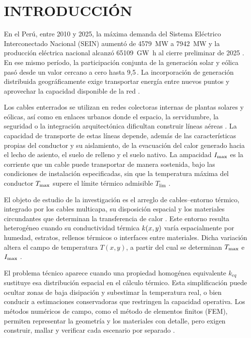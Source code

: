 \chapter*{INTRODUCCIÓN}
\thispagestyle{empty}

En el Perú, entre 2010 y 2025, la máxima demanda del Sistema Eléctrico Interconectado Nacional (SEIN) aumentó de \SI{4579}{\mega\watt} a \SI{7942}{\mega\watt} y la producción eléctrica nacional alcanzó \SI{65109}{\giga\watt\hour} al cierre preliminar de 2025 \parencites[sec.~10.4]{minem2025anuario2024}[cuadro~4]{minem2025indicadoresDiciembre}{coesMaximaDemanda}. En ese mismo período, la participación conjunta de la generación solar y eólica pasó desde un valor cercano a cero hasta 9,5\,\pct{}. La incorporación de generación distribuida geográficamente exige transportar energía entre nuevos puntos y aprovechar la capacidad disponible de la red \parencite{iea2025transmissiongrid}.

Los cables enterrados se utilizan en redes colectoras internas de plantas solares y eólicas, así como en enlaces urbanos donde el espacio, la servidumbre, la seguridad o la integración arquitectónica dificultan construir líneas aéreas \parencites{cigre2023overheadLines}{coes2021puntaLomitasEO}{coes2022planTransmision2023_2032}{proinversion2026palian}. La capacidad de transporte de estas líneas depende, además de las características propias del conductor y su aislamiento, de la evacuación del calor generado hacia el lecho de asiento, el suelo de relleno y el suelo nativo. La ampacidad $I_{\max}$ es la corriente que un cable puede transportar de manera sostenida, bajo las condiciones de instalación especificadas, sin que la temperatura máxima del conductor $T_{\max}$ supere el límite térmico admisible $T_{\mathrm{lim}}$ \parencites[cláusulas~4--5]{iec60287}[3--5]{enescu2020}.

El objeto de estudio de la investigación es el arreglo de cables--entorno térmico, integrado por los cables multicapa, su disposición espacial y los materiales circundantes que determinan la transferencia de calor \parencites[1--3]{enescu2020}[41--42]{cigre2025}. Este entorno resulta heterogéneo cuando su conductividad térmica $k(x,y)$ varía espacialmente por humedad, estratos, rellenos térmicos o interfaces entre materiales. Dicha variación altera el campo de temperatura $T(x,y)$, a partir del cual se determinan $T_{\max}$ e $I_{\max}$ \parencites[3--4]{enescu2021}[1,6--7]{khumalo2025}[3]{xing2023}.

El problema técnico aparece cuando una propiedad homogénea equivalente $k_{eq}$ sustituye esa distribución espacial en el cálculo térmico. Esta simplificación puede ocultar zonas de baja disipación y subestimar la temperatura real, o bien conducir a estimaciones conservadoras que restringen la capacidad operativa. Los métodos numéricos de campo, como el método de elementos finitos (FEM), permiten representar la geometría y los materiales con detalle, pero exigen construir, mallar y verificar cada escenario por separado \parencites[41--42,93--99]{cigre2025}[1--3,12]{aldulaimi2024}.

